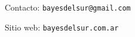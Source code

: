 \documentclass[a4paper,11pt]{article}
\begin{document}
%
%
%
%
%
%
%
%
%
%
%
%
%
%
%
%
%
%
%
%
%
%

 \vspace{0.8cm}
\small
 Contacto: \texttt{bayesdelsur@gmail.com}

 Sitio web: \texttt{bayesdelsur.com.ar}
\end{document}
